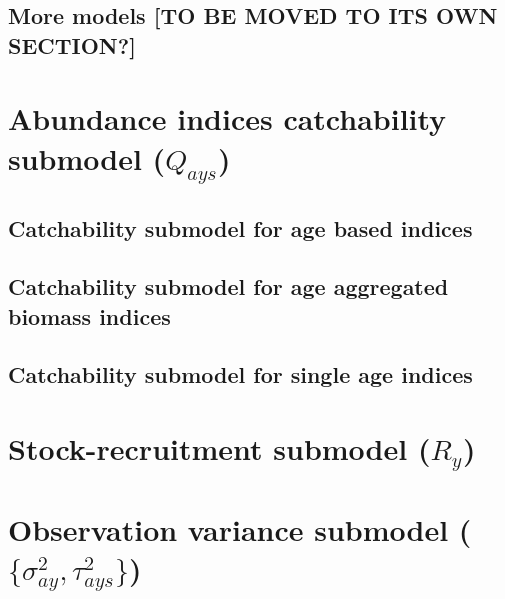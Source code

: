 \documentclass[
]{book}
\begin{document}
\hypertarget{more-models-to-be-moved-to-its-own-section}{%
\subsection{More models {[}TO BE MOVED TO ITS OWN SECTION?{]}}\label{more-models-to-be-moved-to-its-own-section}}

\hypertarget{abundance-indices-catchability-submodel-q_ays}{%
\section{\texorpdfstring{Abundance indices catchability submodel (\(Q_{ays}\))}{Abundance indices catchability submodel (Q\_\{ays\})}}\label{abundance-indices-catchability-submodel-q_ays}}

\hypertarget{catchability-submodel-for-age-based-indices}{%
\subsection{Catchability submodel for age based indices}\label{catchability-submodel-for-age-based-indices}}

\hypertarget{catchability-submodel-for-age-aggregated-biomass-indices}{%
\subsection{Catchability submodel for age aggregated biomass indices}\label{catchability-submodel-for-age-aggregated-biomass-indices}}

\hypertarget{catchability-submodel-for-single-age-indices}{%
\subsection{Catchability submodel for single age indices}\label{catchability-submodel-for-single-age-indices}}

\hypertarget{stock-recruitment-submodel-r_y}{%
\section{\texorpdfstring{Stock-recruitment submodel (\(R_y\))}{Stock-recruitment submodel (R\_y)}}\label{stock-recruitment-submodel-r_y}}

\hypertarget{observation-variance-submodel-sigma2_ay-tau2_ays}{%
\section{\texorpdfstring{Observation variance submodel (\(\{\sigma^2_{ay}, \tau^2_{ays}\}\))}{Observation variance submodel (\textbackslash\{\textbackslash sigma\^{}2\_\{ay\}, \textbackslash tau\^{}2\_\{ays\}\textbackslash\})}}\label{observation-variance-submodel-sigma2_ay-tau2_ays}}
\end{document}
